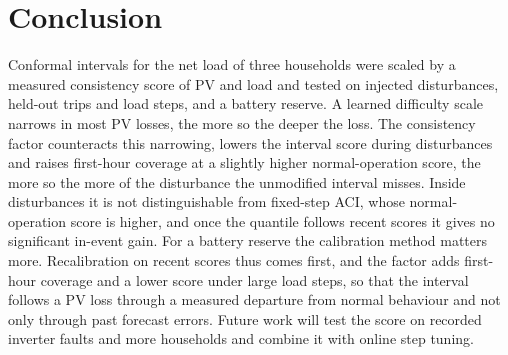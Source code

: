 \documentclass[conference,a4paper]{IEEEtran}
\begin{document}
\section{Conclusion}\label{sec:conclusion}
Conformal intervals for the net load of three households were scaled by a measured consistency score of PV and load and
tested on injected disturbances, held-out trips and load steps, and a battery reserve. A learned difficulty
scale narrows in most PV losses, the more so the deeper the loss. The consistency factor counteracts this
narrowing, lowers the interval score during disturbances and raises first-hour coverage at a slightly higher
normal-operation score, the more so the more of the disturbance the unmodified interval misses. Inside disturbances
it is not distinguishable from fixed-step ACI, whose normal-operation score is higher, and once the quantile follows
recent scores it gives no significant in-event gain. For a battery reserve the calibration method matters more.
Recalibration on recent scores thus comes first, and the factor adds first-hour coverage and a lower score
under large load steps, so that the interval follows a PV loss through a measured departure from normal behaviour
and not only through past forecast errors. Future work will test the score on recorded inverter faults and more
households and combine it with online step tuning.



\end{document}
